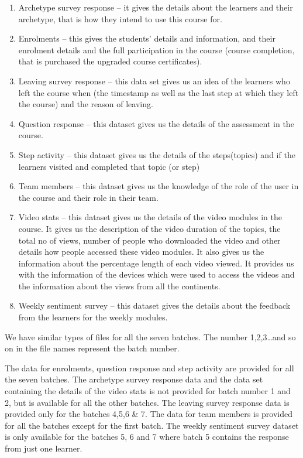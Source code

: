 \documentclass[
]{article}
\begin{document}
\begin{enumerate}
\def\labelenumi{\arabic{enumi})}
\item
  Archetype survey response -- it gives the details about the learners
  and their archetype, that is how they intend to use this course for.
\item
  Enrolments -- this gives the students' details and information, and
  their enrolment details and the full participation in the course
  (course completion, that is purchased the upgraded course
  certificates).
\item
  Leaving survey response -- this data set gives us an idea of the
  learners who left the course when (the timestamp as well as the last
  step at which they left the course) and the reason of leaving.
\item
  Question response -- this dataset gives us the details of the
  assessment in the course.
\item
  Step activity -- this dataset gives us the details of the
  steps(topics) and if the learners visited and completed that topic (or
  step)
\item
  Team members -- this dataset gives us the knowledge of the role of the
  user in the course and their role in their team.
\item
  Video stats -- this dataset gives us the details of the video modules
  in the course. It gives us the description of the video duration of
  the topics, the total no of views, number of people who downloaded the
  video and other details how people accessed these video modules. It
  also gives us the information about the percentage length of each
  video viewed. It provides us with the information of the devices which
  were used to access the videos and the information about the views
  from all the continents.
\item
  Weekly sentiment survey -- this dataset gives the details about the
  feedback from the learners for the weekly modules.
\end{enumerate}

We have similar types of files for all the seven batches. The number
1,2,3\ldots and so on in the file names represent the batch number.

The data for enrolments, question response and step activity are
provided for all the seven batches. The archetype survey response data
and the data set containing the details of the video stats is not
provided for batch number 1 and 2, but is available for all the other
batches. The leaving survey response data is provided only for the
batches 4,5,6 \& 7. The data for team members is provided for all the
batches except for the first batch. The weekly sentiment survey dataset
is only available for the batches 5, 6 and 7 where batch 5 contains the
response from just one learner.
\end{document}
